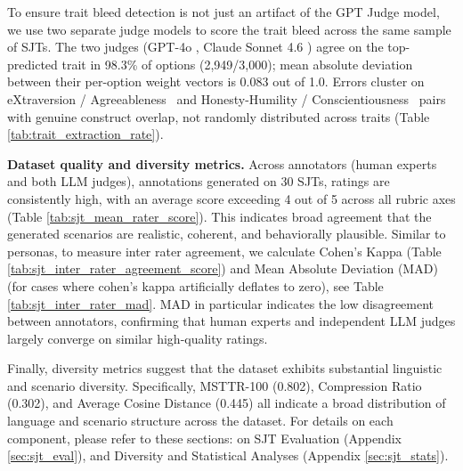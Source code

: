 \documentclass[11pt]{article}
\newcommand{\honestyhumility}{%
  {\textcolor{hexH}{Honesty-Humility}}%
}
\newcommand{\extraversion}{%
  {\textcolor{hexX}{eXtraversion}}%
}
\newcommand{\agreeableness}{%
  {\textcolor{hexA}{Agreeableness}}%
}
\newcommand{\conscientiousness}{%
  {\textcolor{hexC}{Conscientiousness}}%
}
\begin{document}
To ensure trait bleed detection is not just an artifact of the GPT Judge model, we use two separate judge models to score the trait bleed across the same sample of SJTs. The two judges (GPT-4o \citep{openai2024gpt4ocard} , Claude Sonnet 4.6 \citep{anthropic2026claudesonnet}) agree on the top-predicted trait in 98.3\% of options (2,949/3,000); mean absolute deviation between their per-option weight vectors is 0.083 out of 1.0. Errors cluster on \extraversion/\agreeableness\ and \honestyhumility/\conscientiousness\ pairs with genuine construct overlap, not randomly distributed across traits (Table \ref{tab:trait_extraction_rate}).


\vspace{0.3cm}

\noindent \textbf{Dataset quality and diversity metrics.} Across annotators (human experts and both LLM judges), annotations generated on 30 SJTs, ratings are consistently high, with an average score exceeding 4 out of 5 across all rubric axes (Table \ref{tab:sjt_mean_rater_score}). This indicates broad agreement that the generated scenarios are realistic, coherent, and behaviorally plausible. 
Similar to personas, to measure inter rater agreement, we calculate Cohen’s Kappa \citep{cohen_kappa_original} (Table \ref{tab:sjt_inter_rater_agreement_score}) and Mean Absolute Deviation (MAD) (for cases where cohen's kappa artificially deflates to zero), see Table \ref{tab:sjt_inter_rater_mad}. MAD in particular indicates the low disagreement between annotators, confirming that human experts and independent LLM judges largely converge on similar high-quality ratings.

Finally, diversity metrics suggest that the dataset exhibits substantial linguistic and scenario diversity. Specifically, MSTTR-100 (0.802), Compression Ratio (0.302), and Average Cosine Distance (0.445) all indicate a broad distribution of language and scenario structure across the dataset. For details on each component, please refer to these sections: on SJT Evaluation (Appendix \ref{sec:sjt_eval}), and Diversity and Statistical Analyses (Appendix \ref{sec:sjt_stats}).
\end{document}
